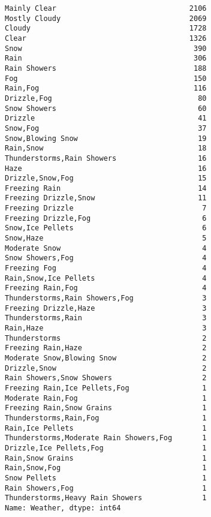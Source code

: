 \documentclass[11pt]{article}
\makeatletter
\newcommand{\boxspacing}{\kern\kvtcb@left@rule\kern\kvtcb@boxsep}
\newcommand{\prompt}[4]{
        {\ttfamily\llap{{\color{#2}[#3]:\hspace{3pt}#4}}\vspace{-\baselineskip}}
    }
\makeatother
\begin{document}
            \begin{tcolorbox}[breakable, size=fbox, boxrule=.5pt, pad at break*=1mm, opacityfill=0]
\prompt{Out}{outcolor}{35}{\boxspacing}
\begin{Verbatim}[commandchars=\\\{\}]
Mainly Clear                               2106
Mostly Cloudy                              2069
Cloudy                                     1728
Clear                                      1326
Snow                                        390
Rain                                        306
Rain Showers                                188
Fog                                         150
Rain,Fog                                    116
Drizzle,Fog                                  80
Snow Showers                                 60
Drizzle                                      41
Snow,Fog                                     37
Snow,Blowing Snow                            19
Rain,Snow                                    18
Thunderstorms,Rain Showers                   16
Haze                                         16
Drizzle,Snow,Fog                             15
Freezing Rain                                14
Freezing Drizzle,Snow                        11
Freezing Drizzle                              7
Freezing Drizzle,Fog                          6
Snow,Ice Pellets                              6
Snow,Haze                                     5
Moderate Snow                                 4
Snow Showers,Fog                              4
Freezing Fog                                  4
Rain,Snow,Ice Pellets                         4
Freezing Rain,Fog                             4
Thunderstorms,Rain Showers,Fog                3
Freezing Drizzle,Haze                         3
Thunderstorms,Rain                            3
Rain,Haze                                     3
Thunderstorms                                 2
Freezing Rain,Haze                            2
Moderate Snow,Blowing Snow                    2
Drizzle,Snow                                  2
Rain Showers,Snow Showers                     2
Freezing Rain,Ice Pellets,Fog                 1
Moderate Rain,Fog                             1
Freezing Rain,Snow Grains                     1
Thunderstorms,Rain,Fog                        1
Rain,Ice Pellets                              1
Thunderstorms,Moderate Rain Showers,Fog       1
Drizzle,Ice Pellets,Fog                       1
Rain,Snow Grains                              1
Rain,Snow,Fog                                 1
Snow Pellets                                  1
Rain Showers,Fog                              1
Thunderstorms,Heavy Rain Showers              1
Name: Weather, dtype: int64
\end{Verbatim}
\end{tcolorbox}
        
\end{document}
